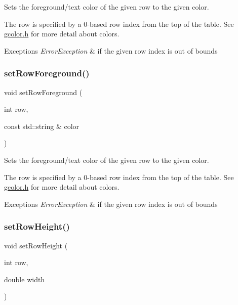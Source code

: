 Sets the foreground/text color of the given row to the given color. 

The row is specified by a 0-\/based row index from the top of the table. See \mbox{\hyperlink{gcolor_8h_source}{gcolor.\+h}} for more detail about colors. 
\begin{DoxyExceptions}{Exceptions}
{\em Error\+Exception} & if the given row index is out of bounds \\
\hline
\end{DoxyExceptions}
\mbox{\label{classGTable_a27ede8127bd8889e3f71dfe152c1684d}} 
\subsubsection{\texorpdfstring{set\+Row\+Foreground()}{setRowForeground()}\hspace{0.1cm}{\footnotesize\ttfamily [2/2]}}
{\footnotesize\ttfamily void set\+Row\+Foreground (\begin{DoxyParamCaption}\item[{int}]{row,  }\item[{const std\+::string \&}]{color }\end{DoxyParamCaption})\hspace{0.3cm}{\ttfamily [virtual]}}



Sets the foreground/text color of the given row to the given color. 

The row is specified by a 0-\/based row index from the top of the table. See \mbox{\hyperlink{gcolor_8h_source}{gcolor.\+h}} for more detail about colors. 
\begin{DoxyExceptions}{Exceptions}
{\em Error\+Exception} & if the given row index is out of bounds \\
\hline
\end{DoxyExceptions}
\mbox{\label{classGTable_a815f0bed3e7a76d99b4a026808a555b3}} 
\subsubsection{\texorpdfstring{set\+Row\+Height()}{setRowHeight()}}
{\footnotesize\ttfamily void set\+Row\+Height (\begin{DoxyParamCaption}\item[{int}]{row,  }\item[{double}]{width }\end{DoxyParamCaption})\hspace{0.3cm}{\ttfamily [virtual]}}



